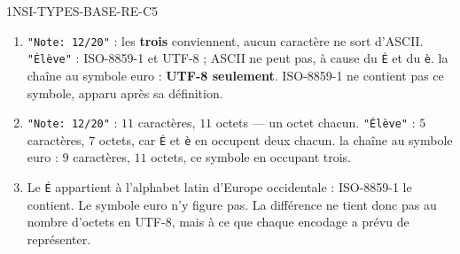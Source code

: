 \begin{corrige}{1NSI-TYPES-BASE-RE-C5}
\begin{enumerate}
  \item \lstinline{"Note: 12/20"} : les \textbf{trois} conviennent, aucun caractère ne sort
        d'ASCII.
        \lstinline{"Élève"} : ISO-8859-1 et UTF-8 ; ASCII ne peut pas, à cause du
        \lstinline{É} et du \lstinline{è}.
        la chaîne au symbole euro : \textbf{UTF-8 seulement}. ISO-8859-1 ne contient pas ce
        symbole, apparu après sa définition.
  \item \lstinline{"Note: 12/20"} : $11$ caractères, $11$ octets — un octet chacun.
        \lstinline{"Élève"} : $5$ caractères, $7$ octets, car \lstinline{É} et \lstinline{è}
        en occupent deux chacun.
        la chaîne au symbole euro : $9$ caractères, $11$ octets, ce symbole en occupant trois.
  \item Le \lstinline{É} appartient à l'alphabet latin d'Europe occidentale : ISO-8859-1 le
        contient. Le symbole euro n'y figure pas. La différence ne tient donc pas au nombre
        d'octets en UTF-8, mais à ce que chaque encodage a prévu de représenter.
\end{enumerate}
\end{corrige}
